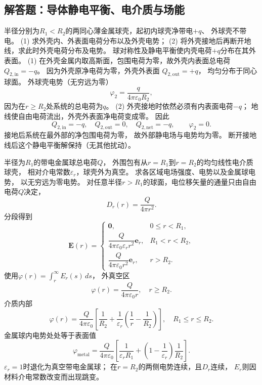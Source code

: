\subsection{解答题：导体静电平衡、电介质与场能}

\problemtext 半径分别为$R_1<R_2$的两同心薄金属球壳，起初内球壳净带电$+q$、
外球壳不带电。
(1) 求外壳内、外表面电荷分布以及外壳电势；
(2) 将外壳接地后再断开地线，求此时外壳电荷分布及电势。
\workings
球对称性及静电平衡使内壳电荷$+q$分布在其外表面。
(1) 在外壳金属内取高斯面，包围电荷为零，故外壳内表面总电荷
$\boxed{Q_{2,\mathrm{in}}=-q}$。
因为外壳原净电荷为零，外壳外表面
$\boxed{Q_{2,\mathrm{out}}=+q}$，
均匀分布于同心球面。
外球壳电势（无穷远为零）
\[
\boxed{\varphi_2=\frac{q}{4\pi\varepsilon_0R_2}},
\]
因为在$r\ge R_2$处系统的总电荷为$q$。
(2) 外壳接地时依然必须有内表面电荷$-q$；
地线使自由电荷流出，外壳外表面净电荷变成零。
因此
\[
\boxed{Q_{2,\mathrm{in}}=-q,\quad
Q_{2,\mathrm{out}}=0,\quad
Q_{2,\mathrm{net}}=-q},\qquad
\boxed{\varphi_2=0}.
\]
\crosscheck 接地后系统在最外部的净包围电荷为零，
故外部静电场与电势均为零。
断开接地线后这个静电平衡解保持（无其他扰动）。

\problemtext 半径为$R_1$的带电金属球总电荷$Q$，
外围包有从$r=R_1$到$r=R_2$的均匀线性电介质球壳，
相对介电常数$\varepsilon_r$，球壳外为真空。
求各区域电场强度、电势以及金属球电势，
以无穷远为零电势。
\workings
对任意半径$r>R_1$的球面，电位移矢量的通量只由自由电荷$Q$决定，
\[
D_r(r)=\frac{Q}{4\pi r^2}.
\]
分段得到
\[
\boxed{\bm E(r)=
\begin{cases}
\bm0,&0\le r<R_1,\\
\dfrac{Q}{4\pi\varepsilon_0\varepsilon_r r^2}\bm e_r,
  &R_1<r<R_2,\\
\dfrac{Q}{4\pi\varepsilon_0 r^2}\bm e_r,&r>R_2.
\end{cases}}
\]
使用$\varphi(r)=\int_r^\infty E_r(s)\,ds$，
外真空区
\[
\boxed{\varphi(r)=\frac{Q}{4\pi\varepsilon_0r}},\quad r\ge R_2.
\]
介质内部
\[
\boxed{\varphi(r)=\frac{Q}{4\pi\varepsilon_0}
\left[\frac1{R_2}+
\frac1{\varepsilon_r}\left(\frac1r-\frac1{R_2}\right)\right]},
\quad R_1\le r\le R_2.
\]
金属球内电势处处等于表面值
\[
\boxed{\varphi_{\mathrm{metal}}=
\frac{Q}{4\pi\varepsilon_0}
\left[\frac1{\varepsilon_rR_1}
+\left(1-\frac1{\varepsilon_r}\right)\frac1{R_2}\right]}.
\]
\crosscheck $\varepsilon_r=1$时退化为真空带电金属球；
在$r=R_2$的两侧电势连续，且$D_r$连续，
$E_r$则因材料介电常数改变而出现跳变。

